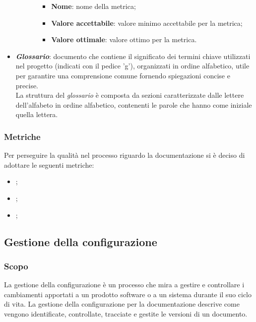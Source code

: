 \begin{itemize}
\begin{itemize}
\begin{itemize}
\begin{itemize}
                                  \item \textbf{Nome}: nome della metrica;
                                  \item \textbf{Valore accettabile}: valore minimo accettabile per la metrica;
                                  \item \textbf{Valore ottimale}: valore ottimo per la metrica.
                              \end{itemize}
                    \end{itemize}
          \end{itemize}
    \item \textit{\textbf{Glossario}}: documento che contiene il significato dei termini chiave utilizzati nel progetto (indicati con il pedice 'g'), organizzati in ordine alfabetico, utile per garantire una comprensione comune fornendo spiegazioni concise e precise.
          \\La struttura del \textit{glossario} è composta da sezioni caratterizzate dalle lettere dell'alfabeto in ordine alfabetico, contenenti le parole che hanno come iniziale quella lettera.
\end{itemize}

\subsubsection{Metriche}
Per perseguire la qualità nel processo riguardo la documentazione si è deciso
di adottare le seguenti metriche:
\begin{itemize}
    \item {};
    \item {};
    \item {};
\end{itemize}

\subsection{Gestione della configurazione}
\subsubsection{Scopo}
La gestione della configurazione è un processo che mira a gestire e controllare
i cambiamenti apportati a un prodotto software o a un sistema durante il suo
ciclo di vita. La gestione della configurazione per la documentazione descrive
come vengono identificate, controllate, tracciate e gestite le versioni di un
documento.
